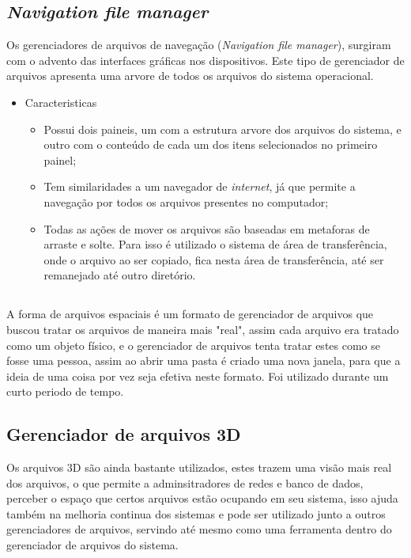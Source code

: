 \documentclass[12pt,a4paper,openany,oneside]{abntex2}
\begin{document}


\subsection{\textit{Navigation file manager}}

Os gerenciadores de arquivos de navegação (\textit{Navigation file manager}), surgiram com o advento das interfaces gráficas nos dispositivos. Este tipo de gerenciador de arquivos apresenta uma arvore de todos os arquivos do sistema operacional.

\begin{itemize}
	\item Caracteristicas
	\begin{itemize}
	\item Possui dois paineis, um com a estrutura arvore dos arquivos do sistema, e outro com o conteúdo de cada um dos itens selecionados no primeiro painel;
	\item Tem similaridades a um navegador de \textit{internet}, já que permite a navegação por todos os arquivos presentes no computador;
	\item Todas as ações de mover os arquivos são baseadas em metaforas de arraste e solte. Para isso é utilizado o sistema de área de transferência, onde o arquivo ao ser copiado, fica nesta área de transferência, até ser remanejado até outro diretório.
	\end{itemize}
\end{itemize}

\subsection{}

A forma de arquivos espaciais é um formato de gerenciador de arquivos que buscou tratar os arquivos de maneira mais "real", assim cada arquivo era tratado como um objeto físico, e o gerenciador de arquivos tenta tratar estes como se fosse uma pessoa, assim ao abrir uma pasta é criado uma nova janela, para que a ideia de uma coisa por vez seja efetiva neste formato. Foi utilizado durante um curto periodo de tempo.

\subsection{Gerenciador de arquivos 3D}

Os arquivos 3D são ainda bastante utilizados, estes trazem uma visão mais real dos arquivos, o que permite a adminsitradores de redes e banco de dados, perceber o espaço que certos arquivos estão ocupando em seu sistema, isso ajuda também na melhoria continua dos sistemas e pode ser utilizado junto a outros  gerenciadores de arquivos, servindo até mesmo como uma ferramenta dentro do gerenciador de arquivos do sistema.
\end{document}
